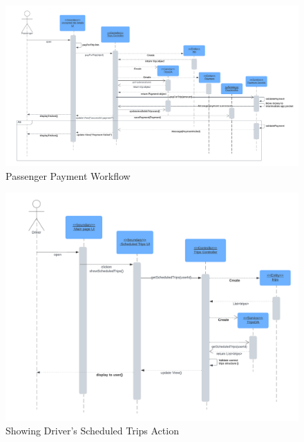 \documentclass[a4paper, 12pt]{report} %
\begin{document}
        \FloatBarrier


        \begin{figure}
            \centering
            \includegraphics[width=\linewidth]{Images/Passenger Payment.png}
            \caption{Passenger Payment Workflow}
            \label{fig:seq_dig_pass_payment}
        \end{figure}

        \FloatBarrier


        \begin{figure}
            \centering
            \includegraphics[width=\linewidth]{Images/Driver Scheduled.png}
            \caption{Showing Driver's Scheduled Trips Action}
            \label{fig:seq_dig_driver_scheduled}
        \end{figure}
\end{document}
